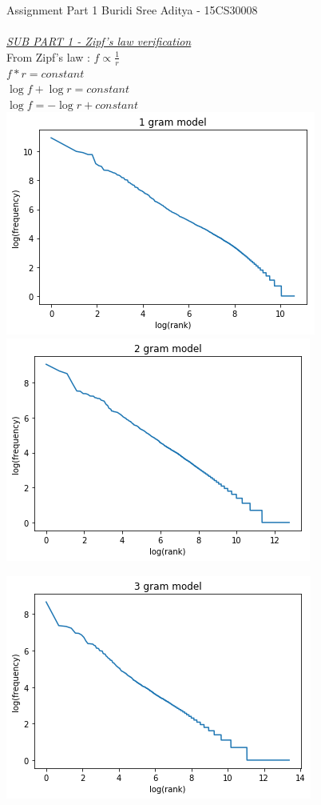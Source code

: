\documentclass[11ppt]{article}
\begin{document}
{\rmfamily\mdseries\Large Assignment Part 1 \hfill Buridi Sree Aditya - 15CS30008}\\
\hrulefill \\
\vspace{3mm}
\textit{\underline{SUB PART 1 - Zipf's law verification}}\\
\vspace{3mm}
From Zipf's law : $ f\propto \frac{1}{r}$\\
$ f*r = constant $ \\
$ \log f + \log r = constant $ \\
$ \log f = -\log r + constant $ \\


\includegraphics[scale=0.6]{unigram}
\includegraphics[scale=0.6]{bigram}

\includegraphics[scale=0.6]{trigram}
\end{document}

